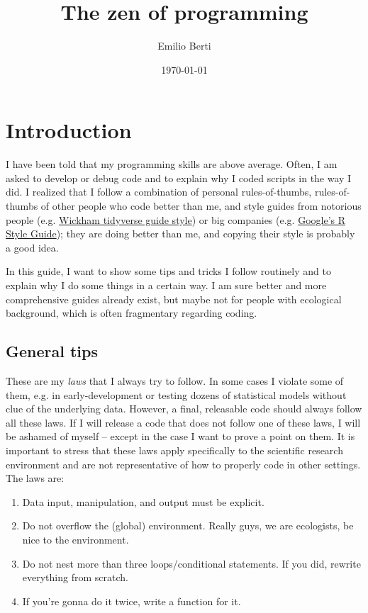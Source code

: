 \documentclass{book}
\title{The zen of programming}
\author{Emilio Berti}
\date{\today}
\begin{document}
\maketitle

\tableofcontents

\chapter{Introduction}

I have been told that my programming skills are above average. Often, I am asked to develop or debug code and to explain why I coded scripts in the way I did. I realized that I follow a combination of personal rules-of-thumbs, rules-of-thumbs of other people who code better than me, and style guides from notorious people (e.g. \href{https://style.tidyverse.org/}{Wickham tidyverse guide style}) or big companies (e.g. \href{https://google.github.io/styleguide/Rguide.html}{Google’s R Style Guide}); they are doing better than me, and copying their style is probably a good idea. 

In this guide, I want to show some tips and tricks I follow routinely and to explain why I do some things in a certain way. I am sure better and more comprehensive guides already exist, but maybe not for people with ecological background, which is often fragmentary regarding coding.

\section{General tips}

These are my \textit{laws} that I always try to follow. In some cases I violate some of them, e.g. in early-development or testing dozens of statistical models without clue of the underlying data. However, a final, releasable code should always follow all these laws. If I will release a code that does not follow one of these laws, I will be ashamed of myself -- except in the case I want to prove a point on them. It is important to stress that these laws apply specifically to the scientific research environment and are not representative of how to properly code in other settings. The laws are:

\begin{enumerate}
    \item Data input, manipulation, and output must be explicit.
    \item Do not overflow the (global) environment. Really guys, we are ecologists, be nice to the environment.
    \item Do not nest more than three loops/conditional statements. If you did, rewrite everything from scratch.
    \item If you're gonna do it twice, write a function for it.
\end{enumerate}
\end{document}
